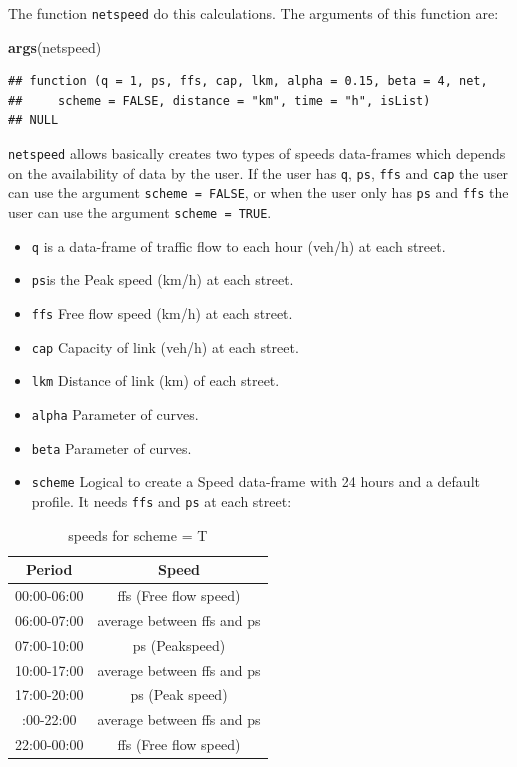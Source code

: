 \documentclass[12pt,graybox,envcountchap,sectrefs]{krantz}
\makeatletter
\newenvironment{Shaded}{\begin{snugshade}}{\end{snugshade}}
\newcommand{\KeywordTok}[1]{\textcolor[rgb]{0.13,0.29,0.53}{\textbf{#1}}}
\newcommand{\NormalTok}[1]{#1}
\providecommand{\tightlist}{%
  \setlength{\itemsep}{0pt}\setlength{\parskip}{0pt}}
\newenvironment{kframe}{%
\medskip{}
\setlength{\fboxsep}{.8em}
 \def\at@end@of@kframe{}%
 \ifinner\ifhmode%
  \def\at@end@of@kframe{\end{minipage}}%
  \begin{minipage}{\columnwidth}%
 \fi\fi%
 \def\FrameCommand##1{\hskip\@totalleftmargin \hskip-\fboxsep
 \colorbox{shadecolor}{##1}\hskip-\fboxsep
     \hskip-\linewidth \hskip-\@totalleftmargin \hskip\columnwidth}%
 \MakeFramed {\advance\hsize-\width
   \@totalleftmargin\z@ \linewidth\hsize
   \@setminipage}}%
 {\par\unskip\endMakeFramed%
 \at@end@of@kframe}
\renewenvironment{Shaded}{\begin{kframe}}{\end{kframe}}
\theoremstyle{definition}
\theoremstyle{definition}
\theoremstyle{definition}
\theoremstyle{remark}
\makeatother
\begin{document}
The function \texttt{netspeed} do this calculations. The arguments of
this function are:

\begin{Shaded}
\begin{Highlighting}[]
\KeywordTok{args}\NormalTok{(netspeed)}
\end{Highlighting}
\end{Shaded}

\begin{verbatim}
## function (q = 1, ps, ffs, cap, lkm, alpha = 0.15, beta = 4, net, 
##     scheme = FALSE, distance = "km", time = "h", isList) 
## NULL
\end{verbatim}

\texttt{netspeed} allows basically creates two types of speeds
data-frames which depends on the availability of data by the user. If
the user has \texttt{q}, \texttt{ps}, \texttt{ffs} and \texttt{cap} the
user can use the argument \texttt{scheme\ =\ FALSE}, or when the user
only has \texttt{ps} and \texttt{ffs} the user can use the argument
\texttt{scheme\ =\ TRUE}.

\begin{itemize}
\tightlist
\item
  \texttt{q} is a data-frame of traffic flow to each hour (veh/h) at
  each street.
\item
  \texttt{ps}is the Peak speed (km/h) at each street.
\item
  \texttt{ffs} Free flow speed (km/h) at each street.
\item
  \texttt{cap} Capacity of link (veh/h) at each street.
\item
  \texttt{lkm} Distance of link (km) of each street.
\item
  \texttt{alpha} Parameter of \citet{bpr} curves.
\item
  \texttt{beta} Parameter of \citet{bpr} curves.
\item
  \texttt{scheme} Logical to create a Speed data-frame with 24 hours and
  a default profile. It needs \texttt{ffs} and \texttt{ps} at each
  street:
\end{itemize}

\begin{table}

\caption{\label{tab:unnamed-chunk-46}speeds for scheme = T}
\centering
\begin{tabular}[t]{cc}
\toprule
Period & Speed\\
\midrule
00:00-06:00 & ffs (Free flow speed)\\
06:00-07:00 & average between ffs and ps\\
07:00-10:00 & ps (Peakspeed)\\
10:00-17:00 & average between ffs and ps\\
17:00-20:00 & ps (Peak speed)\\
\addlinespace
20:00-22:00 & average between ffs and ps\\
22:00-00:00 & ffs (Free flow speed)\\
\bottomrule
\end{tabular}
\end{table}
\end{document}
